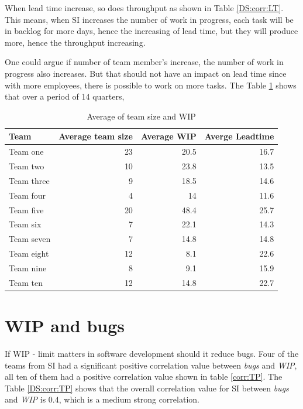 \documentclass[UKenglish]{ifimaster}  %
\begin{document}
When lead time increase, so does throughput as shown in Table \ref{DS:corr:LT}. This means, when SI increases the number of work in progress, each task will be in backlog for more days, hence the increasing of lead time, but they will produce more, hence the throughput increasing. 


One could argue if number of team member's increase, the number of work in progress also increases. But that should not have an impact on lead time since with more employees, there is possible to work on more tasks.  The Table \ref{DS:corr:WIP:Team:LT} shows that over a period of 14 quarters,

 \begin{table}[!htbp]
 \centering
 \begin{tabular}{|l|r|r|r|}
  \hline
  \textbf{Team} & \textbf{Average team size} & \textbf{Average WIP} & \textbf{Averge Leadtime}\\ \hline
Team one & 23 & 20.5 &   16.7\\ \hline
Team two & 10 & 23.8 &  13.5\\ \hline
Team three & 9 &  18.5  & 14.6\\ \hline
Team four & 4 &  14  & 11.6\\ \hline
Team five & 20 &  48.4  & 25.7\\ \hline
Team six & 7 &  22.1  & 14.3\\ \hline
Team seven & 7 & 14.8  & 14.8\\ \hline
Team eight & 12 &  8.1 & 22.6\\ \hline
Team nine  & 8 &  9.1  & 15.9\\ \hline
Team ten & 12 &  14.8 &  22.7\\ \hline
 \end{tabular}
 \caption{Average of team size and WIP}
 \label{DS:corr:WIP:Team:LT}
 \end{table}

\section{WIP and bugs} 
If WIP - limit matters in software development should it reduce bugs. Four of the teams from SI had a significant positive correlation value between \textit{bugs} and \textit{WIP}, all ten of them had a positive correlation value shown in table \ref{corr:TP}. The Table \ref{DS:corr:TP} shows that the overall correlation value for SI between  \textit{bugs} and \textit{WIP} is 0.4, which is a medium strong correlation. 
\end{document}

